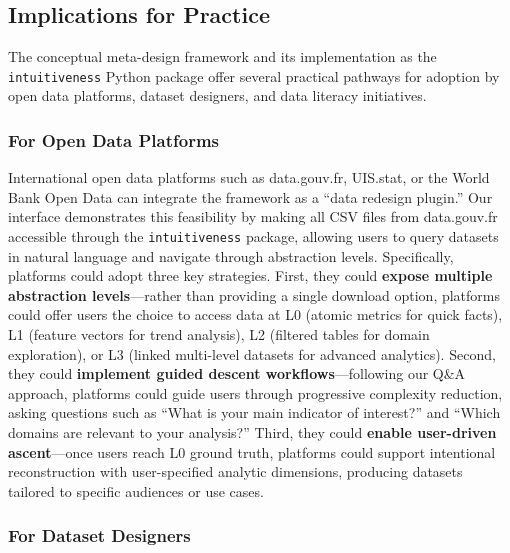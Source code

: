 \documentclass[12pt,a4paper]{article}
\begin{document}
\subsection{Implications for Practice}


The conceptual meta-design framework and its implementation as the \texttt{intuitiveness} Python package offer several practical pathways for adoption by open data platforms, dataset designers, and data literacy initiatives.

\subsubsection{For Open Data Platforms}

International open data platforms such as data.gouv.fr, UIS.stat, or the World Bank Open Data can integrate the framework as a ``data redesign plugin.'' Our interface demonstrates this feasibility by making all CSV files from data.gouv.fr accessible through the \texttt{intuitiveness} package, allowing users to query datasets in natural language and navigate through abstraction levels. Specifically, platforms could adopt three key strategies. First, they could \textbf{expose multiple abstraction levels}---rather than providing a single download option, platforms could offer users the choice to access data at L0 (atomic metrics for quick facts), L1 (feature vectors for trend analysis), L2 (filtered tables for domain exploration), or L3 (linked multi-level datasets for advanced analytics). Second, they could \textbf{implement guided descent workflows}---following our Q\&A approach, platforms could guide users through progressive complexity reduction, asking questions such as ``What is your main indicator of interest?'' and ``Which domains are relevant to your analysis?'' Third, they could \textbf{enable user-driven ascent}---once users reach L0 ground truth, platforms could support intentional reconstruction with user-specified analytic dimensions, producing datasets tailored to specific audiences or use cases.

\subsubsection{For Dataset Designers}
\end{document}
